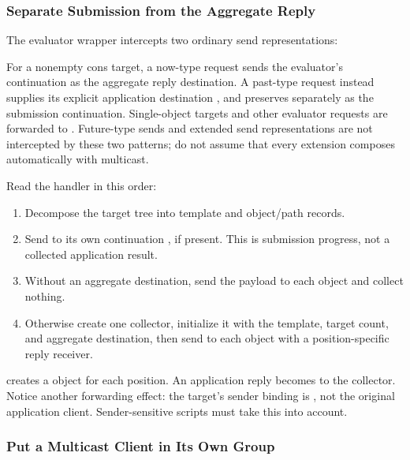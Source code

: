 \subsubsection{Separate Submission from the Aggregate Reply}

The evaluator wrapper intercepts two ordinary send representations:


For a nonempty cons target, a now-type request sends the evaluator's
continuation  as the aggregate reply destination. A past-type
request instead supplies its explicit application destination ,
and preserves  separately as the submission continuation.
Single-object targets and other evaluator requests are forwarded to
. Future-type sends and extended send representations
are not intercepted by these two patterns; do not assume that every
extension composes automatically with multicast.

Read the  handler in this order:

\begin{enumerate}[nosep]
  \item Decompose the target tree into template and object/path records.
  \item Send  to its own continuation , if present.
        This is submission progress, not a collected application result.
  \item Without an aggregate destination, send the payload to each object
        and collect nothing.
  \item Otherwise create one collector, initialize it with the template,
        target count, and aggregate destination, then send to each object
        with a position-specific reply receiver.
\end{enumerate}

 creates a  object for each
position. An application reply becomes 
to the collector. Notice another forwarding effect: the target's sender
binding is , not the original application client.
Sender-sensitive scripts must take this into account.

\subsubsection{Put a Multicast Client in Its Own Group}

